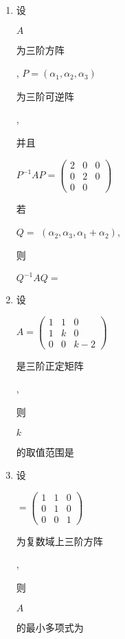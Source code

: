 \documentclass[10pt]{article}
\begin{document}
\begin{enumerate}
  \item \begin{CJK}{UTF8}{mj}设\end{CJK} $A$ \begin{CJK}{UTF8}{mj}为三阶方阵\end{CJK}, $P=\left(\alpha_{1}, \alpha_{2}, \alpha_{3}\right)$ \begin{CJK}{UTF8}{mj}为三阶可逆阵\end{CJK}, \begin{CJK}{UTF8}{mj}并且\end{CJK} $P^{-1} A P=\left(\begin{array}{lll}2 & 0 & 0 \\ 0 & 2 & 0 \\ 0 & 0\end{array}\right)$ \begin{CJK}{UTF8}{mj}若\end{CJK} $Q=$ $\left(\alpha_{2}, \alpha_{3}, \alpha_{1}+\alpha_{2}\right)$, \begin{CJK}{UTF8}{mj}则\end{CJK} $Q^{-1} A Q=$

  \item \begin{CJK}{UTF8}{mj}设\end{CJK} $A=\left(\begin{array}{ccc}1 & 1 & 0 \\ 1 & k & 0 \\ 0 & 0 & k-2\end{array}\right)$ \begin{CJK}{UTF8}{mj}是三阶正定矩阵\end{CJK}, \begin{CJK}{UTF8}{mj}则\end{CJK} $k$ \begin{CJK}{UTF8}{mj}的取值范围是\end{CJK}

  \item \begin{CJK}{UTF8}{mj}设\end{CJK} $=\left(\begin{array}{ccc}1 & 1 & 0 \\ 0 & 1 & 0 \\ 0 & 0 & 1\end{array}\right)$ \begin{CJK}{UTF8}{mj}为复数域上三阶方阵\end{CJK}, \begin{CJK}{UTF8}{mj}则\end{CJK} $A$ \begin{CJK}{UTF8}{mj}的最小多项式为\end{CJK}


\end{enumerate}
\end{document}
